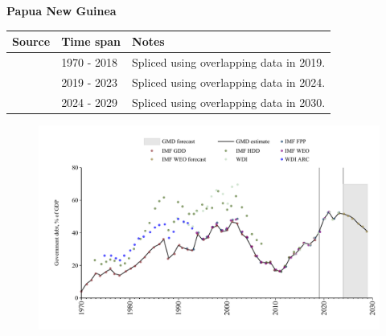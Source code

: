 \documentclass[12pt,a4paper,landscape]{article}
\begin{document}
\begin{adjustbox}{max totalsize={\paperwidth}{\paperheight},center}
\begin{minipage}[t][\textheight][t]{\textwidth}
\vspace*{0.5cm}
{}
\begin{center}
{\Large\bfseries Papua New Guinea}
\end{center}
\vspace{0.5cm}
\begin{table}[H]
\centering
\small
\begin{tabular}{|l|l|l|}
\hline
\textbf{Source} & \textbf{Time span} & \textbf{Notes} \\
\hline
\rowcolor{white}\cite{IMF_GDD}& 1970 - 2018 &Spliced using overlapping data in 2019.\\
\rowcolor{lightgray}\cite{IMF_FPP}& 2019 - 2023 &Spliced using overlapping data in 2024.\\
\rowcolor{white}\cite{IMF_WEO_forecast}& 2024 - 2029 &Spliced using overlapping data in 2030.\\
\hline
\end{tabular}
\end{table}
\begin{figure}[H]
\centering
\includegraphics[width=\textwidth,height=0.6\textheight,keepaspectratio]{graphs/PNG_govdebt_GDP.pdf}
\end{figure}
\end{minipage}
\end{adjustbox}
\end{document}

